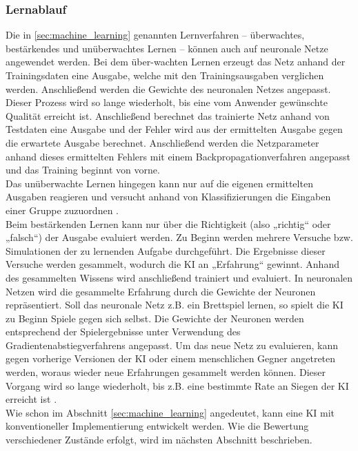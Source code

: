 \documentclass[12pt,a4paper,bibliography=totocnumbered,listof=totocnumbered]{article}
\begin{document}
\subsubsection{Lernablauf}
Die in \autoref{sec:machine_learning} genannten Lernverfahren – überwachtes, bestärkendes und unüberwachtes Lernen – können auch auf neuronale Netze angewendet werden. Bei dem über-wachten Lernen erzeugt das Netz anhand der Trainingsdaten eine Ausgabe, welche mit den Trainingsausgaben verglichen werden. Anschließend werden die Gewichte des neuronalen Netzes angepasst. Dieser Prozess wird so lange wiederholt, bis eine vom Anwender gewünschte Qualität erreicht ist. Anschließend berechnet das trainierte Netz anhand von Testdaten eine Ausgabe und der Fehler wird aus der ermittelten Ausgabe gegen die erwartete Ausgabe berechnet. Anschließend werden die Netzparameter anhand dieses ermittelten Fehlers mit einem Backpropagationverfahren angepasst und das Training beginnt von vorne.\\
Das unüberwachte Lernen hingegen kann nur auf die eigenen ermittelten Ausgaben reagieren und versucht anhand von Klassifizierungen die Eingaben einer Gruppe zuzuordnen \citep[S. 199]{UweLammel.2020}.\\
Beim bestärkenden Lernen kann nur über die Richtigkeit (also „richtig“ oder „falsch“) der Ausgabe evaluiert werden. Zu Beginn werden mehrere Versuche bzw. Simulationen der zu lernenden Aufgabe durchgeführt. Die Ergebnisse dieser Versuche werden gesammelt, wodurch die KI an „Erfahrung“ gewinnt. Anhand des gesammelten Wissens wird anschließend trainiert und evaluiert. In neuronalen Netzen wird die gesammelte Erfahrung durch die Gewichte der Neuronen repräsentiert. Soll das neuronale Netz z.B. ein Brettspiel lernen, so spielt die KI zu Beginn Spiele gegen sich selbst. Die Gewichte der Neuronen werden entsprechend der Spielergebnisse unter Verwendung des Gradientenabstiegverfahrens angepasst. Um das neue Netz zu evaluieren, kann gegen vorherige Versionen der KI oder einem menschlichen Gegner angetreten werden, woraus wieder neue Erfahrungen gesammelt werden können. Dieser Vorgang wird so lange wiederholt, bis z.B. eine bestimmte Rate an Siegen der KI erreicht ist \citep[Kapitel 9.1 f.]{Ferguson.2019}.\\
Wie schon im Abschnitt \ref{sec:machine_learning} angedeutet, kann eine KI mit konventioneller Implementierung entwickelt werden. Wie die Bewertung verschiedener Zustände erfolgt, wird im nächsten Abschnitt beschrieben. 
\end{document}

